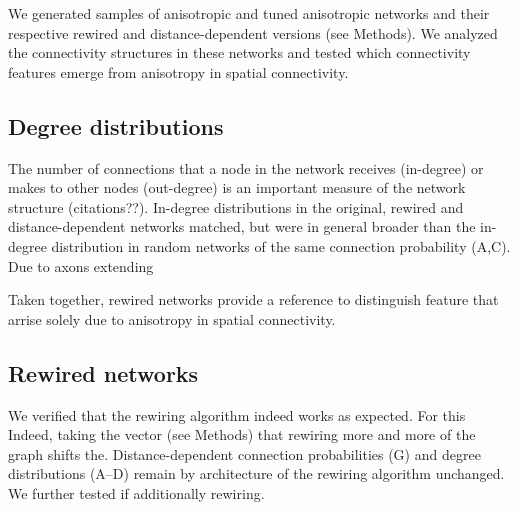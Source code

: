 
We generated samples of anisotropic and tuned anisotropic networks and
their respective rewired and distance-dependent versions (see
Methods). We analyzed the connectivity structures in these networks
and tested which connectivity features emerge from anisotropy in
spatial connectivity.

\subsection{Degree distributions}

The number of connections that a node in the network receives
(in-degree) or makes to other nodes (out-degree) is an important
measure of the network structure (citations??). In-degree
distributions in the original, rewired and distance-dependent networks
matched, but were in general broader than the in-degree distribution
in random networks of the same connection probability
(A,C). Due to axons extending



Taken together, rewired networks provide a reference to distinguish
feature that arrise solely due to anisotropy in spatial connectivity.



        
\subsection{Rewired networks}

We verified that the rewiring algorithm indeed works as
expected. For this Indeed, taking the vector (see Methods) that rewiring more
and more of the graph shifts the. Distance-dependent connection
probabilities (G) and degree distributions
(A--D) remain by architecture of the rewiring
algorithm unchanged. We further tested if additionally rewiring.





